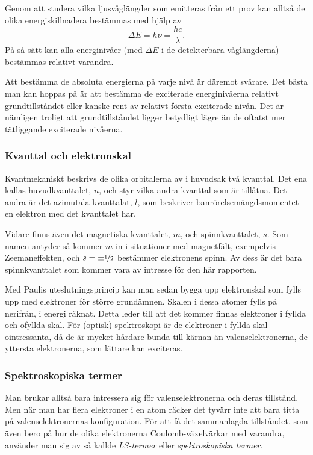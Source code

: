 \documentclass[11pt,a4paper]{article}
\begin{document}
 
Genom att studera vilka ljusvåglängder som emitteras från ett prov
kan alltså de olika energiskillnadera bestämmas med hjälp av  
\[\Delta E = h\nu=\frac{hc}{\lambda}.\]
På så sätt kan alla energinivåer (med $\Delta E$ i de detekterbara
våglängderna) bestämmas relativt varandra. 

Att bestämma de absoluta
energierna på varje nivå är däremot svårare. Det bästa man kan hoppas
på är att bestämma de exciterade energinivåerna relativt
grundtillståndet eller kanske rent av relativt första exciterade
nivån. Det är nämligen troligt att grundtillståndet ligger betydligt
lägre än de oftatst mer tätliggande exciterade nivåerna. 

\subsubsection{Kvanttal och elektronskal}
Kvantmekaniskt beskrivs de olika orbitalerna av i huvudsak två
kvanttal. Det ena kallas huvudkvanttalet, $n$, och styr vilka andra
kvanttal som är tillåtna. Det andra är det azimutala kvanttalat, $l$,
som beskriver banrörelsemängdsmomentet en elektron med det kvanttalet
har. 

Vidare finns även det magnetiska kvanttalet, $m$, och spinnkvanttalet,
$s$. Som namen antyder så kommer $m$ in i situationer med magnetfält,
exempelvis Zeemaneffekten, och $s=\pm\nicefrac{1}{2}$ bestämmer
elektronens spinn. 
Av dess är det bara spinnkvanttalet som kommer vara av intresse för
den här rapporten.  

Med Paulis uteslutningsprincip kan man sedan bygga upp elektronskal
som fylls upp med elektroner för större grundämnen. Skalen i dessa
atomer fylls på nerifrån, i energi räknat. Detta leder till att det
kommer finnas elektroner i fyllda och ofyllda skal. För (optisk)
spektroskopi är de elektroner i fyllda skal ointressanta, då de är
mycket hårdare bunda till kärnan än valenselektronerna, de yttersta
elektronerna, som lättare kan exciteras. 



\subsubsection{Spektroskopiska termer}\label{sec:term}
Man brukar alltså bara intressera sig för valenselektronerna och deras
tillstånd. Men när man har flera elektroner i en atom räcker det
tyvärr inte att bara titta på valenselektronernas konfiguration. För att
få det sammanlagda tillståndet, som även bero på hur de olika
elektronerna Coulomb-växelvärkar med varandra, använder man sig av så
kallde \emph{LS-termer} eller \emph{spektroskopiska termer}.
\end{document}
